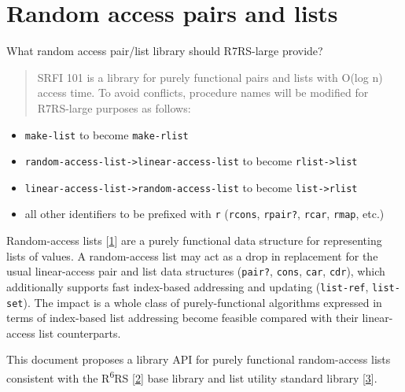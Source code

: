 \section{Random access pairs and lists}
 What random access pair/list library should R7RS-large provide?

\begin{quote}
SRFI 101 is a library for purely functional pairs and lists with O(log
n) access time. To avoid conflicts, procedure names will be modified for
R7RS-large purposes as follows:
\end{quote}

\begin{itemize}
\tightlist
\item
  \texttt{make-list} to become \texttt{make-rlist}
\item
  \texttt{random-access-list-\textgreater{}linear-access-list} to become
  \texttt{rlist-\textgreater{}list}
\item
  \texttt{linear-access-list-\textgreater{}random-access-list} to become
  \texttt{list-\textgreater{}rlist}
\item
  all other identifiers to be prefixed with \texttt{r} (\texttt{rcons},
  \texttt{rpair?}, \texttt{rcar}, \texttt{rmap}, etc.)
\end{itemize}


Random-access lists {[}\protect\hyperlink{note-1}{1}{]} are a purely
functional data structure for representing lists of values. A
random-access list may act as a drop in replacement for the usual
linear-access pair and list data structures (\texttt{pair?},
\texttt{cons}, \texttt{car}, \texttt{cdr}), which additionally supports
fast index-based addressing and updating (\texttt{list-ref},
\texttt{list-set}). The impact is a whole class of purely-functional
algorithms expressed in terms of index-based list addressing become
feasible compared with their linear-access list counterparts.

This document proposes a library API for purely functional random-access
lists consistent with the R\textsuperscript{6}RS
{[}\protect\hyperlink{note-2}{2}{]} base library and list utility
standard library {[}\protect\hyperlink{note-3}{3}{]}.




